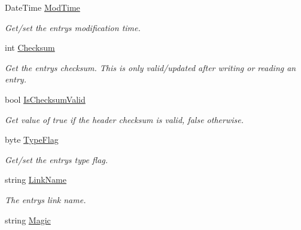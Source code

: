 \begin{DoxyCompactItemize}
Date\+Time \hyperlink{class_i_c_sharp_code_1_1_sharp_zip_lib_1_1_tar_1_1_tar_header_aa68e23118f301217100b1eaba586f2a4}{Mod\+Time}
\begin{DoxyCompactList}\small\item\em Get/set the entry\textquotesingle{}s modification time. \end{DoxyCompactList}\item 
int \hyperlink{class_i_c_sharp_code_1_1_sharp_zip_lib_1_1_tar_1_1_tar_header_a1075620bf99c3b7ddea25b3ba2718a3d}{Checksum}
\begin{DoxyCompactList}\small\item\em Get the entry\textquotesingle{}s checksum. This is only valid/updated after writing or reading an entry. \end{DoxyCompactList}\item 
bool \hyperlink{class_i_c_sharp_code_1_1_sharp_zip_lib_1_1_tar_1_1_tar_header_a78edd3239aa25b939772d87009d9f58a}{Is\+Checksum\+Valid}
\begin{DoxyCompactList}\small\item\em Get value of true if the header checksum is valid, false otherwise. \end{DoxyCompactList}\item 
byte \hyperlink{class_i_c_sharp_code_1_1_sharp_zip_lib_1_1_tar_1_1_tar_header_ab733c51f9d648cf18d4052c23b48313a}{Type\+Flag}
\begin{DoxyCompactList}\small\item\em Get/set the entry\textquotesingle{}s type flag. \end{DoxyCompactList}\item 
string \hyperlink{class_i_c_sharp_code_1_1_sharp_zip_lib_1_1_tar_1_1_tar_header_a05df8a87d66d7312c6abe21bf2ba1c36}{Link\+Name}
\begin{DoxyCompactList}\small\item\em The entry\textquotesingle{}s link name. \end{DoxyCompactList}\item 
string \hyperlink{class_i_c_sharp_code_1_1_sharp_zip_lib_1_1_tar_1_1_tar_header_aab82bace59133969f3ca9a04e3577c82}{Magic}

\end{DoxyCompactItemize}
